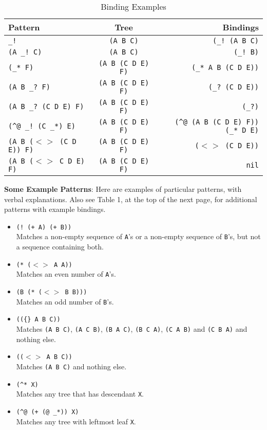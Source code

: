 \documentclass[a4,11pt]{article}
\begin{document}
\begin{table*}
  \begin{center}
  \begin{tabular} {l c r}
    Pattern  & Tree &   Bindings\\
    \hline
    \texttt{\_!}   & \texttt{(A B C)} & \texttt{(\_!~(A B C)}\\
    \texttt{(A \_!~C)}     &        \texttt{(A B C)}   &              \texttt{(\_!~B)}\\
    \texttt{(\_* F)}       &        \texttt{(A B (C D E) F)}   &      \texttt{(\_*  A B (C D E))}\\
    \texttt{(A B \_?~F)}   &        \texttt{(A B (C D E) F)}   &      \texttt{(\_?~(C D E))}\\
    \texttt{(A B \_?~(C D E) F)}  & \texttt{(A B (C D E) F)}   &      \texttt{(\_?{})}\\
    \texttt{(\^{}@ \_!~(C \_*) E)}   & \texttt{(A B (C D E) F)}   &   \texttt{(\^{}@ (A B (C D E) F))  (\_* D E)}\\
    \texttt{(A B ($<>$ (C D E)) F)}  & \texttt{(A B (C D E) F)}   &   \texttt{($<>$ (C D E))}\\
    \texttt{(A B ($<>$ C D E) F)}    & \texttt{(A B (C D E) F)}  &   \texttt{nil}\\
    \hline
  \end{tabular}
  \caption{Binding Examples}
  \end{center}
\end{table*}


{\bf Some Example Patterns}:
Here are examples of particular patterns, with verbal explanations.   Also see Table 1, at the top of the next page, for additional patterns with example bindings.
  \begin{itemize}
  \item \texttt{(!~(+ A) (+ B))}\\Matches a non-empty sequence of \texttt{A}'s or a non-empty sequence of \texttt{B}'s, but not a sequence containing both.
  \item \texttt{(* ($<>$ A A))}\\Matches an even number of \texttt{A}'s.
  \item \texttt{(B (* ($<>$ B B)))}\\Matches an odd number of \texttt{B}'s.
  \item \texttt{((\{\} A B C))}\\Matches \texttt{(A B C)}, \texttt{(A C B)}, \texttt{(B A C)}, \texttt{(B C A)}, \texttt{(C A B)} and \texttt{(C B A)} and nothing else.
  \item \texttt{(($<>$ A B C))}\\Matches \texttt{(A B C)} and nothing else.
  \item \texttt{(\^{}* X)}\\Matches any tree that has descendant \texttt{X}.
  \item \texttt{(\^{}@ (+ (@ \_*)) X)}\\Matches any tree with leftmost leaf \texttt{X}.
  \end{itemize}
\end{document}
